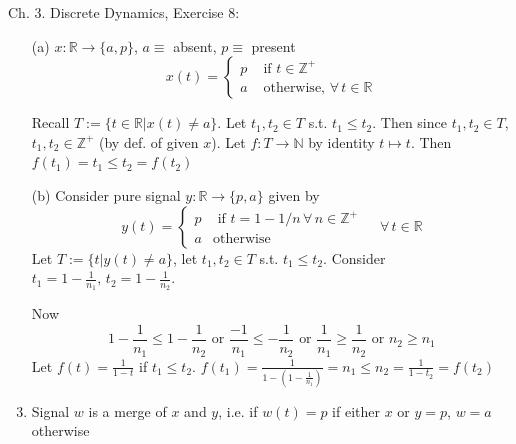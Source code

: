 \documentclass[10pt]{amsart}
\newcommand{\exercisehead}[1]
  { \smallskip
   \noindent{\small\bf Exercise #1.}
  }
\begin{document}
Ch. 3. Discrete Dynamics, Exercise 8:

\exercisehead{8} \begin{enumerate}
	\item[(a)] $x: \mathbb{R} \to \lbrace a, p \rbrace$, $a \equiv $ absent, $p \equiv$ present 
	\[
	x(t) = \begin{cases} p & \text{ if } t \in \mathbb{Z}^+ \\ 
	a & \text{ otherwise, } \forall \, t\in \mathbb{R} \end{cases}
	\]
	
	Recall $T:= \lbrace t\in \mathbb{R} | x(t) \neq a \rbrace$. Let $t_1, t_2 \in T$ s.t. $t_1 \leq t_2$. Then since $t_1, t_2 \in T$, $t_1, t_2 \in \mathbb{Z}^+$ (by def. of given $x$). Let $f:T \to \mathbb{N}$ by identity $t \mapsto t$. Then $f(t_1) = t_1 \leq t_2 = f(t_2)$
 	\item[(b)]  Consider pure signal $y : \mathbb{R} \to \lbrace p, a \rbrace$ given by 
 	\[
 	y(t) = \begin{cases} p  & \text{ if } t = 1 -1/n \, \forall \, n \in \mathbb{Z}^+ \\ 
 	a & \text{otherwise } \end{cases} \quad \, \forall \, t \in \mathbb{R} 
  	\]
  	Let $T := \lbrace t | y(t) \neq a \rbrace$, let $t_1, t_2 \in T$ s.t. $t_1 \leq t_2$. Consider $t_1 = 1 - \frac{1}{n_1}, \, t_2 =  1 - \frac{1}{n_2}$. 
  	
  	Now
  	\[
  		1 - \frac{1}{n_1} \leq 1 - \frac{1}{n_2} \text{ or } \frac{-1}{n_1} \leq -\frac{1}{n_2} \text{ or } \frac{1}{n_1} \geq \frac{1}{n_2} \text{ or } n_2 \geq n_1
  	\]
  	Let $f(t) = \frac{1}{1-t}$ if $t_1 \leq t_2$.  $f(t_1) = \frac{1}{ 1 - \left( 1 - \frac{1}{n_1} \right) } = n_1 \leq n_2  = \frac{1}{ 1 - t_2 } = f(t_2)$
	\item Signal $w$ is a merge of $x$ and $y$, i.e. if $w(t) = p$ if either $x$ or $y = p$, $w=a$ otherwise
\end{enumerate}
\end{document}
